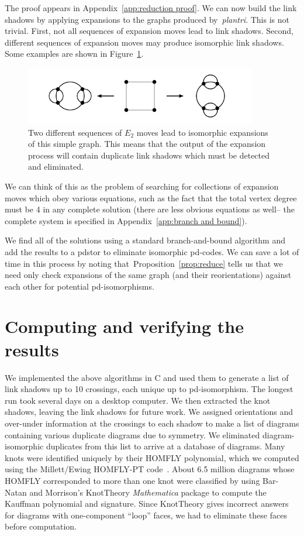 \documentclass[amsmath,secnumarabic,floatfix,amssymb,nofootinbib,nobibnotes,letterpaper,11pt,tightenlines,showkeys]{revtex4}
\theoremstyle{definition}
\newcommand{\edgedouble}{E_2}
\let\mgp=\marginpar \marginparwidth18mm \marginparsep1mm
\def\marginpar#1{\mgp{\raggedright\tiny #1}}
\let\lbl=\label
\def\label#1{\lbl{#1}\ifinner\else\marginpar{\ref{#1} #1}\ignorespaces\fi}
\begin{document}
The proof appears in Appendix~\ref{app:reduction proof}. We can now build the link shadows by applying expansions to the graphs produced by~\emph{plantri}. This is not trivial. First, not all sequences of expansion moves lead to link shadows. Second,
different sequences of expansion moves may produce isomorphic link shadows. Some examples are shown in
Figure~\ref{fig:expansion woes}.
\begin{figure}[ht]
\begin{center}
\includegraphics[width=4in]{isomorphic-expansions.pdf}
\end{center}
\caption{Two different sequences of $\edgedouble$ moves lead to isomorphic expansions of this simple graph. This means that the output of the expansion process will contain duplicate link shadows which must be detected and eliminated.}
\label{fig:expansion woes}
\end{figure}

We can think of this as the problem of searching for collections of expansion moves which obey various equations, such as the fact that the total vertex degree must be 4 in any complete solution (there are less obvious equations as well-- the complete system is specified in Appendix~\ref{app:branch and bound}).

We find all of the solutions using a standard branch-and-bound algorithm and add the results to a pdstor to eliminate isomorphic pd-codes. We can save a lot of time in this process by noting that~Proposition~\ref{prop:reduce} tells us that we need only check expansions of the same graph (and their reorientations) against each other for potential pd-isomorphisms.

\section{Computing and verifying the results}

We implemented the above algorithms in C and used them to generate a list of link shadows up to 10 crossings, each unique up to pd-isomorphism. The longest run took several days on a desktop computer. We then extracted the knot shadows, leaving the link shadows for future work. We assigned orientations and over-under information at the crossings to each shadow to make a list of diagrams containing various duplicate diagrams due to symmetry. We eliminated diagram-isomorphic duplicates from this list to arrive at a database of diagrams. Many knots were identified uniquely by their HOMFLY polynomial, which we computed using the Millett/Ewing HOMFLY-PT code~\cite{MR98k:57010}. About 6.5 million diagrams whose HOMFLY corresponded to more than one knot were classified by using Bar-Natan and Morrison's KnotTheory \emph{Mathematica} package to compute the Kauffman polynomial and signature. Since KnotTheory gives incorrect answers for diagrams with one-component ``loop'' faces, we had to eliminate these faces before computation.
\end{document}
